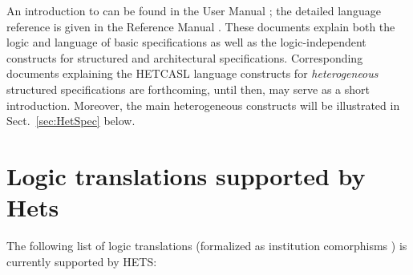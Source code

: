 \documentclass{article}
\newcommand{\normalTEXTSC}[2]{{#1\scriptsize#2}}
\newcommand     {\Hets}{\normalTEXTSC{H}{ETS}\xspace}
\newcommand{\HetCASL}{\normalTEXTSC{H}{ET}\normalTEXTSC{C}{ASL}\xspace}
\begin{document}
An introduction to \CASL can be found in the \CASL User Manual
\cite{CASL-UM}; the detailed language reference is given in
the \CASL Reference Manual \cite{CASL/RefManual}.  These documents
explain both the \CASL logic and language of basic specifications as
well as the logic-independent constructs for structured and
architectural specifications.  Corresponding documents explaining the
\HetCASL language constructs for \emph{heterogeneous} structured specifications
are forthcoming, until then, \cite{Mossakowski:2003:FHS} may serve as a short
introduction. Moreover, the main heterogeneous constructs will be illustrated 
in Sect.~\ref{sec:HetSpec} below.

\section{Logic translations supported
by Hets}
\label{comorphisms}

The following list of logic translations (formalized as institution
comorphisms \cite{GoguenRosu02}) is currently supported by \Hets:
\end{document}
